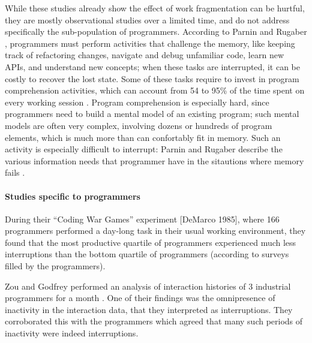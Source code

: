 \documentclass[times]{smrauth}
\newcommand\RR[1]{\textbf{Romain #1}}
\begin{document}
While these studies already show the effect of work fragmentation can be hurtful, they are mostly observational studies over a limited time, and do not address specifically the sub-population of programmers. According to Parnin and Rugaber \cite{PR12}, programmers must perform activities that challenge the memory, like keeping track of refactoring changes, navigate and debug unfamiliar code, learn new APIs, and understand new concepts; when these tasks are interrupted, it can be costly to recover the lost state. Some of these tasks require to invest in program comprehension activities, which can account from 54 to 95\% of the time spent on every working session \cite{MMLK14}. Program comprehension is especially hard, since programmers need to build a mental model of an existing program; such mental models are often very complex, involving dozens or hundreds of program elements, which is much more than can confortably fit in memory. Such an activity is especially difficult to interrupt: Parnin and Rugaber describe the various information needs that programmer have in the sitautions where memory fails \cite{PR12}.





\paragraph{Studies specific to programmers}


During their “Coding War Games” experiment [DeMarco 1985], where 166 programmers performed a day-long task in their usual working environment, they found that the most productive quartile of programmers experienced much less interruptions than the bottom quartile of programmers (according to surveys filled by the programmers).

Zou and Godfrey performed an analysis of interaction histories of 3 industrial programmers for a month \cite{ZG06}. One of their findings was the omnipresence of inactivity in the interaction data, that they interpreted as interruptions. They corroborated this with the programmers which agreed that many such periods of inactivity were indeed interruptions.
\end{document}
